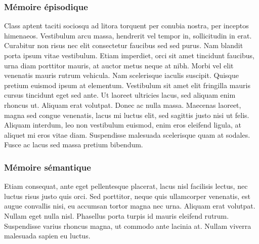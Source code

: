 \subsubsection{Mémoire épisodique}

Class aptent taciti sociosqu ad litora torquent per conubia nostra, per inceptos himenaeos. Vestibulum arcu massa, hendrerit vel tempor in, sollicitudin in erat. Curabitur non risus nec elit consectetur faucibus sed sed purus. Nam blandit porta ipsum vitae vestibulum. Etiam imperdiet, orci sit amet tincidunt faucibus, urna diam porttitor mauris, at auctor metus neque at nibh. Morbi vel elit venenatis mauris rutrum vehicula. Nam scelerisque iaculis suscipit. Quisque pretium euismod ipsum at elementum. Vestibulum sit amet elit fringilla mauris cursus tincidunt eget sed ante. Ut laoreet ultricies lacus, sed aliquam enim rhoncus ut. Aliquam erat volutpat. Donec ac nulla massa. Maecenas laoreet, magna sed congue venenatis, lacus mi luctus elit, sed sagittis justo nisi ut felis. Aliquam interdum, leo non vestibulum euismod, enim eros eleifend ligula, at aliquet mi eros vitae diam. Suspendisse malesuada scelerisque quam at sodales. Fusce ac lacus sed massa pretium bibendum. 

\subsubsection{Mémoire sémantique}

Etiam consequat, ante eget pellentesque placerat, lacus nisl facilisis lectus, nec luctus risus justo quis orci. Sed porttitor, neque quis ullamcorper venenatis, est augue convallis nisi, eu accumsan tortor magna nec urna. Aliquam erat volutpat. Nullam eget nulla nisl. Phasellus porta turpis id mauris eleifend rutrum. Suspendisse varius rhoncus magna, ut commodo ante lacinia at. Nullam viverra malesuada sapien eu luctus. 